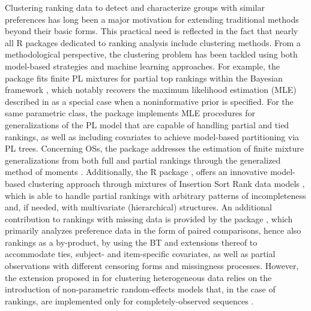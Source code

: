 {Clustering ranking data to detect and characterize groups with similar preferences has long been a major motivation for extending traditional methods beyond their basic forms. This practical need is reflected in the fact that nearly all \textsf{R} packages dedicated to ranking analysis include clustering methods. From a methodological perspective, the clustering problem has been tackled using both model-based strategies and machine learning approaches. For example, the  package \citep{mollica2020plmix} fits finite PL mixtures for partial top rankings within the Bayesian framework \citep{mollica2017bayesian}, which notably recovers the maximum likelihood estimation (MLE) described in \cite{gormley2006analysis} as a special case when a noninformative prior is specified. For the same parametric class, the  package \citep{turner2020} implements MLE procedures for generalizations of the PL model that are capable of handling partial and tied rankings, as well as including covariates to achieve model-based partitioning via PL trees.
Concerning OSs, the  package addresses the estimation of finite mixture generalizations from both full and partial rankings through the generalized method of moments \citep{soufiani}.
Additionally, the \textsf{R} package  \citep{Rankcluster}, offers an innovative model-based clustering approach through mixtures of Insertion Sort Rank data models \citep{Jacques2014}, which is able to handle partial rankings with arbitrary patterns of incompleteness and, if needed, with multivariate (hierarchical) structures.
An additional contribution to rankings with missing data is provided by the  package \citep{prefmod2012}, which primarily analyzes preference data in the form of paired comparisons, hence also rankings as a by-product, by using the BT and extensions thereof to accommodate ties, subject- and item-specific covariates, as well as partial observations with different censoring forms and missingness processes. However, the extension proposed in \citet{prefmod2012} for clustering heterogeneous data relies on the introduction of non-parametric random-effects models that, in the case of rankings, are implemented only for completely-observed sequences \citep{prefmod.package}.}

